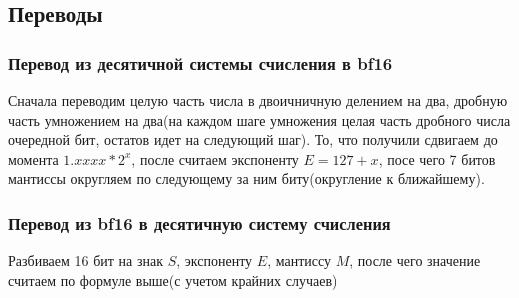 \subsection{Переводы}

\subsubsection{Перевод из десятичной системы счисления в bf16}
Сначала переводим целую часть числа в двоичничную делением на два, дробную часть умножением на два(на каждом шаге умножения целая часть дробного числа очередной бит, остатов идет на следующий шаг). То, что получили сдвигаем до момента $1.xxxx * 2^x$, после считаем экспоненту $E= 127 + x$, посе чего 7 битов мантиссы округляем по следующему за ним биту(округление к ближайшему).

\subsubsection{Перевод из bf16 в десятичную систему счисления}
Разбиваем 16 бит на знак $S$, экспоненту $E$, мантиссу $M$, после чего значение считаем по формуле выше(с учетом крайних случаев)
